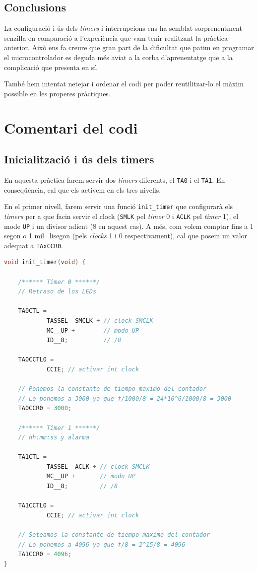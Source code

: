 \documentclass{../pdae} %
\begin{document}
\subsection{Conclusions}

La configuració i ús dels \textit{timers} i interrupcions ens ha semblat
sorprenentment senzilla en comparació a l'experiència que vam tenir realitzant
la pràctica anterior. Això ens fa creure que gran part de la dificultat que
patim en programar el microcontrolador es deguda més aviat a la corba
d'aprenentatge que a la complicació que presenta en sí.

També hem intentat netejar i ordenar el codi per poder reutilitzar-lo el
màxim possible en les properes pràctiques.

\section{Comentari del codi}

\subsection{Inicialització i ús dels timers}

En aquesta pràctica farem servir dos \textit{timers} diferents, el
\texttt{TA0} i el \texttt{TA1}. En conseqüència, cal que els activem en els
tres nivells.

En el primer nivell, farem servir una funció \texttt{init\_timer} que
configurarà els \textit{timers} per a que facin servir el clock (\texttt{SMLK}
pel \textit{timer} 0 i \texttt{ACLK} pel \textit{timer} 1), el mode \texttt{UP}
i un divisor adient (8 en aquest cas). A més, com volem comptar fins a 1 segon
o 1 mil·lisegon (pels \textit{clocks} 1 i 0 respectivament), cal que posem un
valor adequat a \texttt{TAxCCR0}.

\begin{lstlisting}[language=C]
void init_timer(void) {

    /****** Timer 0 ******/
    // Retraso de los LEDs

    TA0CTL =
            TASSEL__SMCLK + // clock SMCLK
            MC__UP +        // modo UP
            ID__8;          // /8

    TA0CCTL0 =
            CCIE; // activar int clock

    // Ponemos la constante de tiempo maximo del contador
    // Lo ponemos a 3000 ya que f/1000/8 = 24*10^6/1000/8 = 3000
    TA0CCR0 = 3000;

    /****** Timer 1 ******/
    // hh:mm:ss y alarma

    TA1CTL =
            TASSEL__ACLK + // clock SMCLK
            MC__UP +       // modo UP
            ID__8;         // /8

    TA1CCTL0 =
            CCIE; // activar int clock

    // Seteamos la constante de tiempo maximo del contador
    // Lo ponemos a 4096 ya que f/8 = 2^15/8 = 4096
    TA1CCR0 = 4096;
}
\end{lstlisting}
\end{document}

